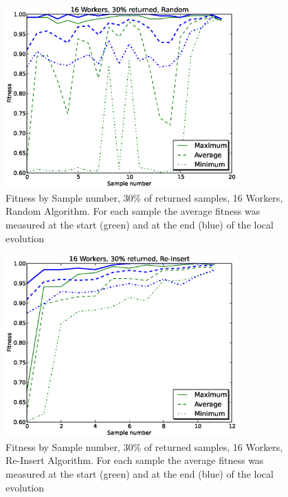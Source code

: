 \documentclass{llncs}
\begin{document}
\begin{figure}[!t]
\centering
\includegraphics[width=3.5in]{Fitness-w16-30-random.eps}
\caption{Fitness by Sample number, 30\% of returned samples, 16 Workers, Random Algorithm. For each sample the average fitness
was measured at the start (green) and at the end (blue) of the local evolution }
\label{fig:Fitness-w16-30-random}
\end{figure}

\begin{figure}[!t]
\centering
\includegraphics[width=3.5in]{Fitness-w16-30-reinsert.eps}
\caption{Fitness by Sample number, 30\% of returned samples, 16 Workers, Re-Insert Algorithm. For each sample the average fitness
was measured at the start (green) and at the end (blue) of the local evolution}
\label{fig:Fitness-w16-30-reinsert}
\end{figure}
\end{document}
